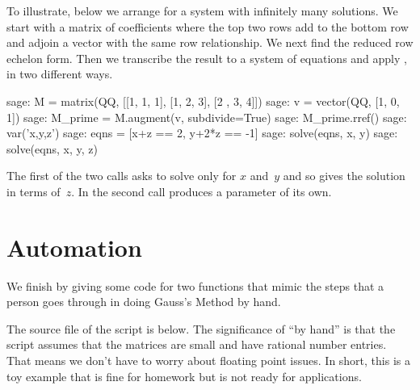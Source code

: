 To illustrate, below we arrange for 
a system with infinitely many solutions.
We start with a matrix of coefficients
where the top two rows add to the bottom row
and adjoin a vector with the same row relationship. 
We next find the reduced row echelon form.
Then we transcribe the result to a system of equations and apply ,
in two different ways.
\begin{sagecommandline}
sage: M = matrix(QQ, [[1, 1, 1], [1, 2, 3], [2 , 3, 4]])    
sage: v = vector(QQ, [1, 0, 1])                            
sage: M_prime = M.augment(v, subdivide=True)               
sage: M_prime.rref()
sage: var('x,y,z')          
sage: eqns = [x+z == 2, y+2*z == -1]
sage: solve(eqns, x, y)   
sage: solve(eqns, x, y, z)                                 
\end{sagecommandline}
The first of the two  calls asks  
to solve only for $x$ and~$y$ and so \Sage{} gives
the solution in terms of~$z$.
In the second call \Sage{} produces a parameter of its own.   




\section{Automation}

We finish by giving some \python{} code for two functions 
that mimic the steps that a person goes through in 
doing Gauss's Method by hand.

The source file of the script is below. 
The significance of ``by hand'' is that the script
assumes that the matrices are small and have rational number entries.
That means we don't have to worry about floating point issues.
In short, this is a toy example that is 
fine for homework but is not ready for applications.


